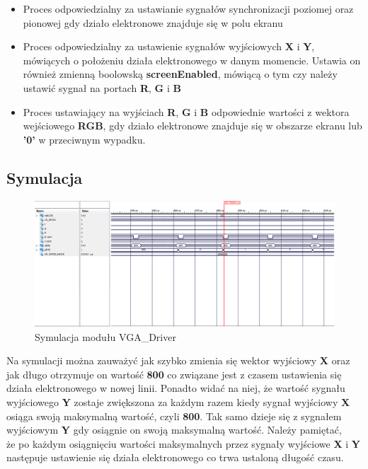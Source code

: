 \documentclass[a4paper]{report}
\begin{document}
			\begin{itemize}
				\item Proces odpowiedzialny za ustawianie sygnałów synchronizacji poziomej oraz pionowej gdy działo elektronowe
				znajduje się w polu ekranu \\
					
				\item Proces odpowiedzialny za ustawienie sygnałów wyjściowych \textbf{X} i \textbf{Y}, mówiących o położeniu działa elektronowego
				w danym momencie. Ustawia on również zmienną boolowską \textbf{screenEnabled}, mówiącą o tym czy
				należy ustawić sygnał na portach \textbf{R}, \textbf{G} i \textbf{B}\\
					
				\item Proces ustawiający na wyjściach \textbf{R}, \textbf{G} i \textbf{B} odpowiednie wartości z wektora wejściowego \textbf{RGB},
				gdy działo elektronowe znajduje się w obszarze ekranu lub \textbf{'0'} w przeciwnym wypadku.\\
					
			\end{itemize}			
			
		\begin{landscape}
			\subsection{Symulacja}
				\begin{figure}[h!]
					\centering
					\includegraphics[width=1.6\textwidth]{vga_driver_symulacja2.png}
					\caption{Symulacja modułu VGA\_Driver}
				\end{figure}
			\justify
            Na symulacji można zauważyć jak szybko zmienia się wektor wyjściowy \textbf{X} oraz jak długo otrzymuje on wartość \textbf{800} co związane jest
            z czasem ustawienia się działa elektronowego w nowej linii. Ponadto widać na niej, że wartość sygnału wyjściowego \textbf{Y} zostaje
            zwiększona za każdym razem kiedy sygnał wyjściowy \textbf{X} osiąga swoją maksymalną wartość, czyli \textbf{800}. Tak samo dzieje się z
            sygnałem wyjściowym \textbf{Y} gdy osiągnie on swoją maksymalną wartość. Należy pamiętać, \\że po każdym osiągnięciu wartości maksymalnych
            przez sygnały wyjściowe \textbf{X} i \textbf{Y} następuje ustawienie się działa elektronowego co trwa ustaloną długość czasu.
		\end{landscape}
		
\end{document}
